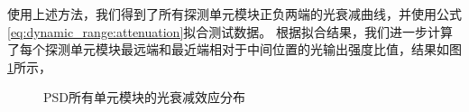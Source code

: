 使用上述方法，我们得到了所有探测单元模块正负两端的光衰减曲线，并使用公式\ref{eq:dynamic_range:attenuation}拟合测试数据。
根据拟合结果，我们进一步计算了每个探测单元模块最远端和最近端相对于中间位置的光输出强度比值，结果如图\ref{fig:cosmic_ray:atten_dist}所示，
\begin{figure}[htb]
\centering
{}
\caption{PSD所有单元模块的光衰减效应分布}
\label{fig:cosmic_ray:atten_dist}
\end{figure}

